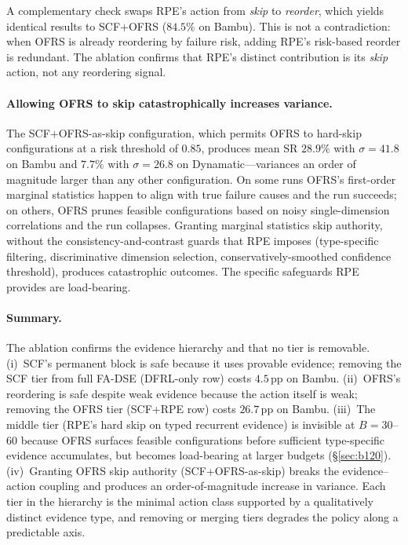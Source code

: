 \documentclass[journal]{IEEEtran}
\begin{document}
A complementary check swaps RPE's action from \emph{skip} to \emph{reorder}, which yields identical results to SCF+OFRS ($84.5\%$ on Bambu). This is not a contradiction: when OFRS is already reordering by failure risk, adding RPE's risk-based reorder is redundant. The ablation confirms that RPE's distinct contribution is its \emph{skip} action, not any reordering signal.

\paragraph{Allowing OFRS to skip catastrophically increases variance.} The SCF+OFRS-as-skip configuration, which permits OFRS to hard-skip configurations at a risk threshold of $0.85$, produces mean SR $28.9\%$ with $\sigma{=}41.8$ on Bambu and $7.7\%$ with $\sigma{=}26.8$ on Dynamatic---variances an order of magnitude larger than any other configuration. On some runs OFRS's first-order marginal statistics happen to align with true failure causes and the run succeeds; on others, OFRS prunes feasible configurations based on noisy single-dimension correlations and the run collapses. Granting marginal statistics skip authority, without the consistency-and-contrast guards that RPE imposes (type-specific filtering, discriminative dimension selection, conservatively-smoothed confidence threshold), produces catastrophic outcomes. The specific safeguards RPE provides are load-bearing.

\paragraph{Summary.} The ablation confirms the evidence hierarchy and that no tier is removable. (i)~SCF's permanent block is safe because it uses provable evidence; removing the SCF tier from full FA-DSE (DFRL-only row) costs $4.5$\,pp on Bambu. (ii)~OFRS's reordering is safe despite weak evidence because the action itself is weak; removing the OFRS tier (SCF+RPE row) costs $26.7$\,pp on Bambu. (iii)~The middle tier (RPE's hard skip on typed recurrent evidence) is invisible at $B{=}30$--$60$ because OFRS surfaces feasible configurations before sufficient type-specific evidence accumulates, but becomes load-bearing at larger budgets (\S\ref{sec:b120}). (iv)~Granting OFRS skip authority (SCF+OFRS-as-skip) breaks the evidence--action coupling and produces an order-of-magnitude increase in variance. Each tier in the hierarchy is the minimal action class supported by a qualitatively distinct evidence type, and removing or merging tiers degrades the policy along a predictable axis.
\end{document}
